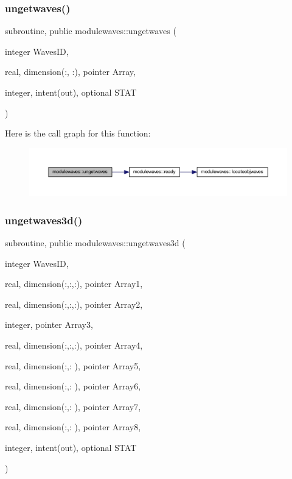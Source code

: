 \subsubsection{\texorpdfstring{ungetwaves()}{ungetwaves()}}
{\footnotesize\ttfamily subroutine, public modulewaves\+::ungetwaves (\begin{DoxyParamCaption}\item[{integer}]{Waves\+ID,  }\item[{real, dimension(\+:, \+:), pointer}]{Array,  }\item[{integer, intent(out), optional}]{S\+T\+AT }\end{DoxyParamCaption})}

Here is the call graph for this function\+:\nopagebreak
\begin{figure}[H]
\begin{center}
\leavevmode
\includegraphics[width=350pt]{namespacemodulewaves_a0c5557cca037fc7fe0c05098f278075d_cgraph}
\end{center}
\end{figure}
\mbox{\label{namespacemodulewaves_a889d8243c00922f75bfc878e13f4990d}} 
\subsubsection{\texorpdfstring{ungetwaves3d()}{ungetwaves3d()}}
{\footnotesize\ttfamily subroutine, public modulewaves\+::ungetwaves3d (\begin{DoxyParamCaption}\item[{integer}]{Waves\+ID,  }\item[{real, dimension(\+:,\+:,\+:), pointer}]{Array1,  }\item[{real, dimension(\+:,\+:,\+:), pointer}]{Array2,  }\item[{integer, pointer}]{Array3,  }\item[{real, dimension(\+:,\+:,\+:), pointer}]{Array4,  }\item[{real, dimension(\+:,\+:  ), pointer}]{Array5,  }\item[{real, dimension(\+:,\+:  ), pointer}]{Array6,  }\item[{real, dimension(\+:,\+:  ), pointer}]{Array7,  }\item[{real, dimension(\+:,\+:  ), pointer}]{Array8,  }\item[{integer, intent(out), optional}]{S\+T\+AT }\end{DoxyParamCaption})}

